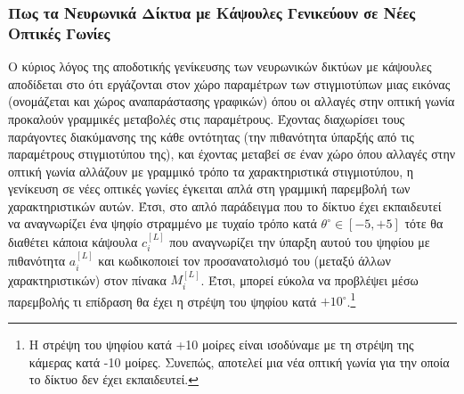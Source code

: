 \subsubsection{Πως τα Νευρωνικά Δίκτυα με Κάψουλες Γενικεύουν σε Νέες Οπτικές Γωνίες}
Ο κύριος λόγος της αποδοτικής γενίκευσης των νευρωνικών δικτύων με κάψουλες αποδίδεται στο ότι εργάζονται στον χώρο παραμέτρων των στιγμιοτύπων μιας εικόνας (ονομάζεται και χώρος αναπαράστασης γραφικών) όπου οι αλλαγές στην οπτική γωνία προκαλούν γραμμικές μεταβολές στις παραμέτρους. Έχοντας διαχωρίσει τους παράγοντες διακύμανσης της κάθε οντότητας (την πιθανότητα ύπαρξής από τις παραμέτρους στιγμιοτύπου της), και έχοντας μεταβεί σε έναν χώρο όπου αλλαγές στην οπτική γωνία αλλάζουν με γραμμικό τρόπο τα χαρακτηριστικά στιγμιοτύπου, η γενίκευση σε νέες οπτικές γωνίες έγκειται απλά στη γραμμική παρεμβολή των χαρακτηριστικών αυτών. Έτσι, στο απλό παράδειγμα που το δίκτυο έχει εκπαιδευτεί να αναγνωρίζει ένα ψηφίο στραμμένο με τυχαίο τρόπο κατά $\theta^\circ \in [-5,+5]$ τότε θα διαθέτει κάποια κάψουλα $c_i^{[L]}$ που αναγνωρίζει την ύπαρξη αυτού του ψηφίου με πιθανότητα $a_i^{[L]}$ και κωδικοποιεί τον προσανατολισμό του (μεταξύ άλλων χαρακτηριστικών) στον πίνακα $M_i^{[L]}$. Έτσι, μπορεί εύκολα να προβλέψει μέσω παρεμβολής τι επίδραση θα έχει η στρέψη του ψηφίου κατά $+10^\circ$.\footnote{Η στρέψη του ψηφίου κατά +10 μοίρες είναι ισοδύναμε με τη στρέψη της κάμερας κατά -10 μοίρες. Συνεπώς, αποτελεί μια νέα οπτική γωνία για την οποία το δίκτυο δεν έχει εκπαιδευτεί.}\par

